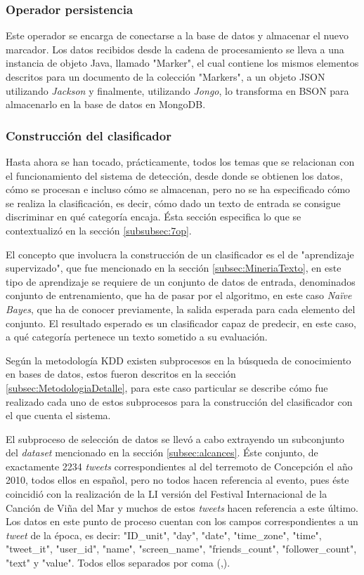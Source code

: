 \subsubsection*{Operador persistencia}
\label{subsubsec:8op}

Este operador se encarga de conectarse a la base de datos y almacenar el nuevo marcador. Los datos recibidos desde la cadena de procesamiento se lleva a una instancia de objeto Java, llamado "Marker", el cual contiene los mismos elementos descritos para un documento de la colección "Markers", a un objeto JSON utilizando \textit{Jackson} y finalmente, utilizando \textit{Jongo}, lo transforma en BSON para almacenarlo en la base de datos en MongoDB.

\subsubsection*{Construcción del clasificador}
\label{subsubsec:clasificacion}

Hasta ahora se han tocado, prácticamente, todos los temas que se relacionan con el funcionamiento del sistema de detección, desde donde se obtienen los datos, cómo se procesan e incluso cómo se almacenan, pero no se ha especificado cómo se realiza la clasificación, es decir, cómo dado un texto de entrada se consigue discriminar en qué categoría encaja. Ésta sección especifica lo que se contextualizó en la sección \ref{subsubsec:7op}.

El concepto que involucra la construcción de un clasificador es el de "aprendizaje supervizado", que fue mencionado en la sección \ref{subsec:MineriaTexto}, en este tipo de aprendizaje se requiere de un conjunto de datos de entrada, denominados conjunto de entrenamiento, que ha de pasar por el algoritmo, en este caso \textit{Naïve Bayes}, que ha de conocer previamente, la salida esperada para cada elemento del conjunto. El resultado esperado es un clasificador capaz de predecir, en este caso, a qué categoría pertenece un texto sometido a su evaluación.

Según la metodología KDD existen subprocesos en la búsqueda de conocimiento en bases de datos, estos fueron descritos en la sección \ref{subsec:MetodologiaDetalle}, para este caso particular se describe cómo fue realizado cada uno de estos subprocesos para la construcción del clasificador con el que cuenta el sistema.

El subproceso de selección de datos se llevó a cabo extrayendo un subconjunto del \textit{dataset} mencionado en la sección \ref{subsec:alcances}. Éste conjunto, de exactamente 2234 \textit{tweets} correspondientes al del terremoto de Concepción el año 2010, todos ellos en español, pero no todos hacen referencia al evento, pues éste coincidió con la realización de la LI versión del Festival Internacional de la Canción de Viña del Mar y muchos de estos \textit{tweets} hacen referencia a este último. Los datos en este punto de proceso cuentan con los campos correspondientes a un \textit{tweet} de la época, es decir: "ID\_unit", "day", "date", "time\_zone", "time", "tweet\_it", "user\_id", "name", "screen\_name", "friends\_count", "follower\_count", "text" y "value". Todos ellos separados por coma (,).

